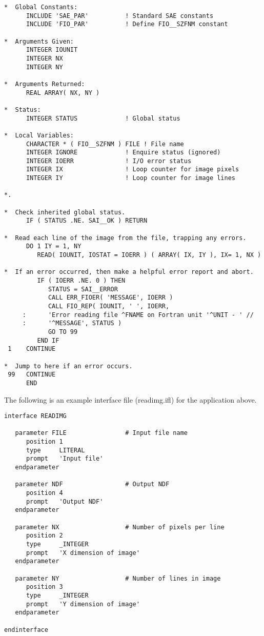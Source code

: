 \begin{verbatim}
*  Global Constants:
      INCLUDE 'SAE_PAR'          ! Standard SAE constants
      INCLUDE 'FIO_PAR'          ! Define FIO__SZFNM constant

*  Arguments Given:
      INTEGER IOUNIT
      INTEGER NX
      INTEGER NY

*  Arguments Returned:
      REAL ARRAY( NX, NY )

*  Status:
      INTEGER STATUS             ! Global status

*  Local Variables:
      CHARACTER * ( FIO__SZFNM ) FILE ! File name
      INTEGER IGNORE             ! Enquire status (ignored)
      INTEGER IOERR              ! I/O error status
      INTEGER IX                 ! Loop counter for image pixels
      INTEGER IY                 ! Loop counter for image lines

*.

*  Check inherited global status.
      IF ( STATUS .NE. SAI__OK ) RETURN

*  Read each line of the image from the file, trapping any errors.
      DO 1 IY = 1, NY
         READ( IOUNIT, IOSTAT = IOERR ) ( ARRAY( IX, IY ), IX= 1, NX )

*  If an error occurred, then make a helpful error report and abort.
         IF ( IOERR .NE. 0 ) THEN
            STATUS = SAI__ERROR
            CALL ERR_FIOER( 'MESSAGE', IOERR )
            CALL FIO_REP( IOUNIT, ' ', IOERR,
     :      'Error reading file ^FNAME on Fortran unit '^UNIT - ' //
     :      '^MESSAGE', STATUS )
            GO TO 99
         END IF
 1    CONTINUE

*  Jump to here if an error occurs.
 99   CONTINUE     
      END
\end{verbatim}
\normalsize

The following is an example  interface file
(readimg.ifl) for the application above. 

\small
\begin{verbatim}
interface READIMG

   parameter FILE                # Input file name
      position 1
      type     LITERAL
      prompt   'Input file'
   endparameter

   parameter NDF                 # Output NDF
      position 4
      prompt   'Output NDF'
   endparameter

   parameter NX                  # Number of pixels per line
      position 2
      type     _INTEGER
      prompt   'X dimension of image'
   endparameter

   parameter NY                  # Number of lines in image
      position 3
      type     _INTEGER
      prompt   'Y dimension of image'
   endparameter

endinterface
\end{verbatim}
\normalsize

